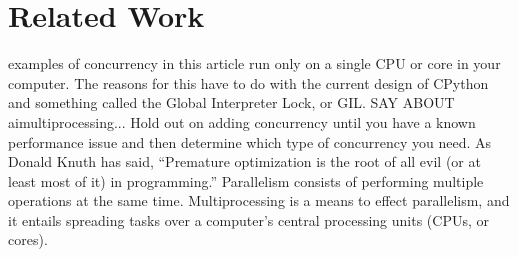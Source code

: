 \chapter{Related Work}
\label{sec:relatedwork}
\minitoc
\vspace*{1cm}

examples of concurrency in this article run only on a single CPU or core in your computer. The reasons for this have to do with the current design of CPython and something called the Global Interpreter Lock, or GIL. SAY ABOUT aimultiprocessing... Hold out on adding concurrency until you have a known performance issue and then determine which type of concurrency you need. As Donald Knuth has said, “Premature optimization is the root of all evil (or at least most of it) in programming.”
Parallelism consists of performing multiple operations at the same time. Multiprocessing is a means to effect parallelism, and it entails spreading tasks over a computer’s central processing units (CPUs, or cores). 
